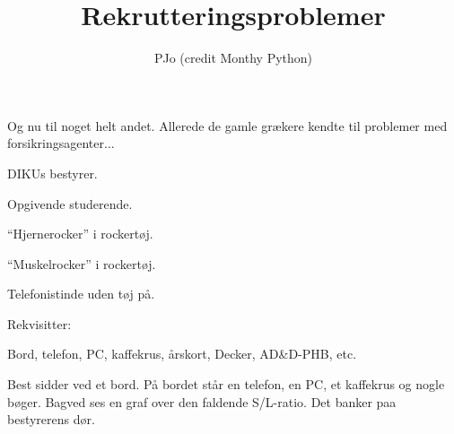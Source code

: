 \documentclass[a4paper,11pt]{article}
\title{Rekrutteringsproblemer}
\author{PJo (credit Monthy Python)}
\begin{document}
\maketitle

Og nu til noget helt andet. Allerede de gamle grækere kendte til
problemer med forsikringsagenter...

\begin{roles}

 DIKUs bestyrer.

 Opgivende studerende.

 ``Hjernerocker'' i rockertøj.

 ``Muskelrocker'' i rockertøj.

 Telefonistinde uden tøj på.

\end{roles}

\noindent Rekvisitter:

\noindent Bord, telefon, PC, kaffekrus, årskort, Decker, AD\&D-PHB, etc.

\scene Best sidder ved et bord. På bordet står en telefon, en PC, et
kaffekrus og nogle bøger. Bagved ses en graf over den faldende S/L-ratio.
Det banker paa bestyrerens dør.
\end{document}
